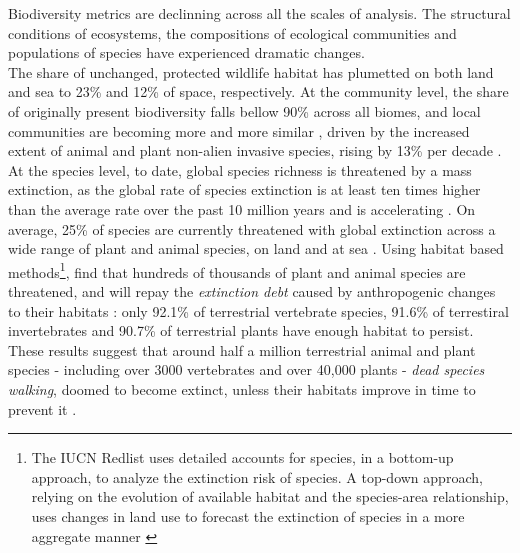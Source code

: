 Biodiversity metrics are declinning across all the scales of analysis. The structural conditions of ecosystems, the compositions of ecological communities and populations of species have experienced dramatic changes.\\
The share of unchanged, protected wildlife habitat has plumetted on both land and sea \citep{watson_2016_catastrophic, jones_2018_location} to 23\% and 12\% of space, respectively. At the community level, the share of originally present biodiversity falls bellow 90\% across all biomes, \citep{Hill311787} and local communities are becoming more and more similar \citep{mckinney_1999_biotic}, driven by the increased extent of animal and plant non-alien invasive species, rising by 13\% per decade \citep{seebens_no_2017}. At the species level, to date, global species richness is threatened by a mass extinction, as the global rate of species extinction is at least ten times higher than the average rate over the past 10 million years and is accelerating \citep{barnosky_has_2011, ceballos_accelerated_2015}. On average, 25\% of species are currently threatened with global extinction across a wide range of plant and animal species, on land and at sea \citep{IUCN_redlist_2024}. Using habitat based methods\footnote{ The IUCN Redlist uses detailed accounts for species, in a bottom-up approach, to analyze the extinction risk of species. A top-down approach, relying on the evolution of available habitat and the species-area relationship, uses changes in land use to forecast the extinction of species in a more aggregate manner \citep{Diamond1972BiogeographicKE}}, \cite{Hoskins309377} find that hundreds of thousands of plant and animal species are threatened, and will repay the \textit{extinction debt} caused by anthropogenic changes to their habitats : only 92.1\% of terrestrial vertebrate species, 91.6\% of terrestiral invertebrates and 90.7\% of terrestrial plants have enough habitat to persist. These results suggest that around half a million terrestrial animal and plant species - including over 3000 vertebrates and over 40,000 plants - \textit{dead species walking}, doomed to become extinct, unless their habitats improve in time to prevent it \citep{ipbes_2022_6417333}.


